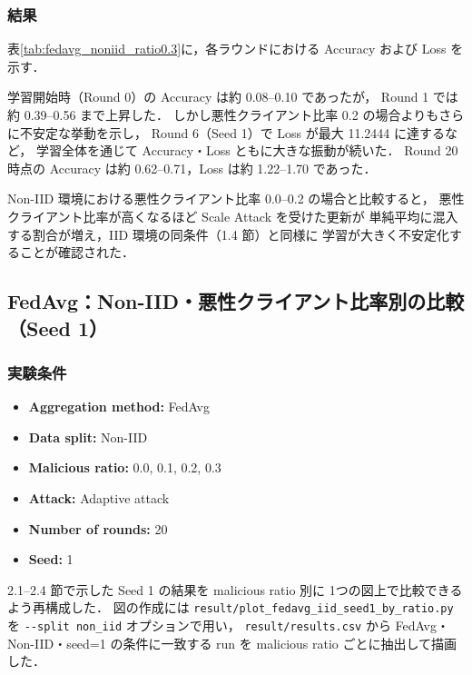\documentclass[a4j,twocolumn,dvipdfmx]{jsarticle}
\begin{document}
\subsubsection{結果}

表\ref{tab:fedavg_noniid_ratio0.3}に，各ラウンドにおける
Accuracy および Loss を示す．

学習開始時（Round 0）の Accuracy は約 0.08--0.10 であったが，
Round 1 では約 0.39--0.56 まで上昇した．
しかし悪性クライアント比率 0.2 の場合よりもさらに不安定な挙動を示し，
Round 6（Seed 1）で Loss が最大 11.2444 に達するなど，
学習全体を通じて Accuracy・Loss ともに大きな振動が続いた．
Round 20 時点の Accuracy は約 0.62--0.71，Loss は約 1.22--1.70 であった．

Non-IID 環境における悪性クライアント比率 0.0--0.2 の場合と比較すると，
悪性クライアント比率が高くなるほど Scale Attack を受けた更新が
単純平均に混入する割合が増え，IID 環境の同条件（1.4 節）と同様に
学習が大きく不安定化することが確認された．

\clearpage
\subsection{FedAvg：Non-IID・悪性クライアント比率別の比較（Seed 1）}

\subsubsection{実験条件}

\begin{itemize}
    \item \textbf{Aggregation method:} FedAvg
    \item \textbf{Data split:} Non-IID
    \item \textbf{Malicious ratio:} 0.0, 0.1, 0.2, 0.3
    \item \textbf{Attack:} Adaptive attack
    \item \textbf{Number of rounds:} 20
    \item \textbf{Seed:} 1
\end{itemize}

2.1--2.4 節で示した Seed 1 の結果を malicious ratio 別に
1つの図上で比較できるよう再構成した．
図の作成には \verb|result/plot_fedavg_iid_seed1_by_ratio.py| を
\verb|--split non_iid| オプションで用い，
\verb|result/results.csv| から FedAvg・Non-IID・seed=1 の条件に一致する
run を malicious ratio ごとに抽出して描画した．
\end{document}
